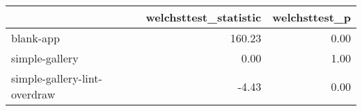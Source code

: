 \begin{tabular}{lrr}
\toprule
{} &  welchsttest\_statistic &  welchsttest\_p \\
\midrule
blank-app                    &                 160.23 &           0.00 \\
simple-gallery               &                   0.00 &           1.00 \\
simple-gallery-lint-overdraw &                  -4.43 &           0.00 \\
\bottomrule
\end{tabular}
